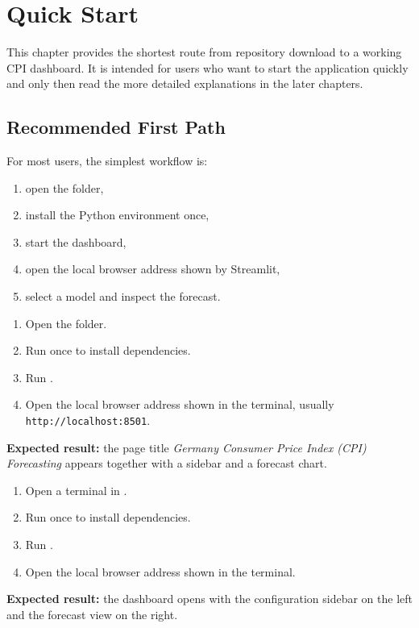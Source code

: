 %
%

\chapter{Quick Start}
\label{ch:quick-start}

This chapter provides the shortest route from repository download to a working CPI dashboard. It is intended for users who want to start the application quickly and only then read the more detailed explanations in the later chapters.

\section{Recommended First Path}

For most users, the simplest workflow is:

\begin{enumerate}
    \item open the  folder,
    \item install the Python environment once,
    \item start the dashboard,
    \item open the local browser address shown by Streamlit,
    \item select a model and inspect the forecast.
\end{enumerate}

\begin{tcolorbox}[colback=green!5!white, colframe=green!75!black, title=Quick Start for Windows]
\begin{enumerate}
    \item Open the  folder.
    \item Run  once to install dependencies.
    \item Run .
    \item Open the local browser address shown in the terminal, usually \texttt{http://localhost:8501}.
\end{enumerate}
\textbf{Expected result:} the page title \textit{Germany Consumer Price Index (CPI) Forecasting} appears together with a sidebar and a forecast chart.
\end{tcolorbox}

\begin{tcolorbox}[colback=blue!5!white, colframe=blue!75!black, title=Quick Start for macOS / Linux]
\begin{enumerate}
    \item Open a terminal in .
    \item Run  once to install dependencies.
    \item Run .
    \item Open the local browser address shown in the terminal.
\end{enumerate}
\textbf{Expected result:} the dashboard opens with the configuration sidebar on the left and the forecast view on the right.
\end{tcolorbox}


